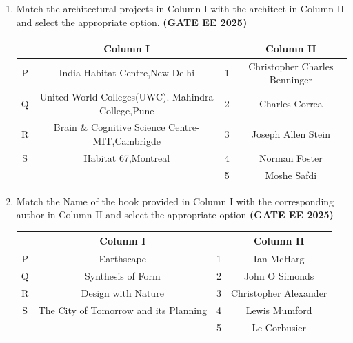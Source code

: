 \documentclass[journal,12pt,onecolumn]{IEEEtran}
\theoremstyle{remark}
\begin{document}
\begin{enumerate}
\begin{enumerate}
\end{enumerate}
\item Match the architectural projects in Column I with the architect in Column II and select the appropriate option. \hfill \textbf{(GATE EE 2025)}\\
\begin{tabular}{|c|c|c|c|} \hline
  & Column I &  & Column II  \\ \hline
P & India Habitat Centre,New Delhi & 1 & Christopher Charles Benninger\\ \hline
Q & United World Colleges(UWC). Mahindra College,Pune & 2 & Charles Correa\\ \hline
R & Brain \& Cognitive Science Centre-MIT,Cambrigde & 3 & Joseph Allen Stein\\ \hline
S & Habitat 67,Montreal & 4 & Norman Foster \\ \hline
 & & 5&Moshe Safdi\\ \hline 
\end{tabular}
\begin{enumerate}
\end{enumerate}
\item Match the Name of the book provided in Column I with the corresponding author in Column II and select the appropriate option \hfill \textbf{(GATE EE 2025)}\\
\begin{tabular}{|c|c|c|c|} \hline
 & Column I & &Column II\\ \hline
P & Earthscape &1&Ian McHarg\\ \hline
Q &Synthesis of Form &2&John O Simonds\\ \hline
R &Design with Nature&3&Christopher Alexander\\ \hline
S & The City of Tomorrow and its Planning &4&Lewis Mumford\\ \hline
 & &5&Le Corbusier\\ \hline
 \end{tabular}

\end{enumerate}
\end{document}
